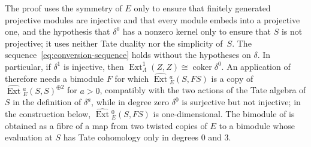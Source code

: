 \begin{remark}
  \label{rem:conversion-mechanism}
  The proof uses the symmetry of $E$ only to ensure that finitely generated
  projective modules are injective and that every module embeds into a
  projective one, and the hypothesis that $\delta^0$ has a nonzero kernel only to
  ensure that $S$ is not projective; it uses neither Tate duality nor the
  simplicity of~$S$. The
  sequence~\eqref{eq:conversion-sequence} holds without the hypotheses on
  $\delta$. In particular, if $\delta^1$ is injective, then
  ${\operatorname{Ext}^1_\Lambda(Z,Z)\cong\operatorname{coker}\delta^0}$. An
  application of  therefore needs a bimodule $F$ for
  which $\widehat{\operatorname{Ext}}{}^a_E(S,FS)$ is a copy of
  $\widehat{\operatorname{Ext}}{}^a_E(S,S)^{\oplus2}$ for ${a>0}$, compatibly
  with the two actions of the Tate algebra of $S$ in the definition of
  $\delta^a$, while in degree zero $\delta^0$ is surjective but not injective;
  in the construction below, $\widehat{\operatorname{Ext}}{}^0_E(S,FS)$ is
  one-dimensional. The bimodule of  is obtained as a
  fibre of a map from two twisted copies of $E$ to a bimodule whose evaluation
  at $S$ has Tate cohomology only in degrees $0$ and $3$.
\end{remark}
